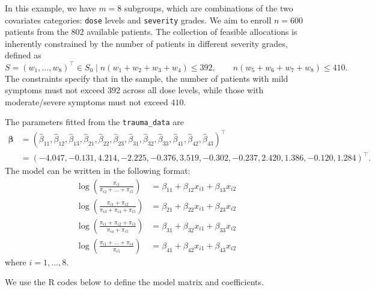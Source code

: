 In this example, we have $m=8$ subgroups, which are combinations of the two covariates categories: \texttt{dose} levels and \texttt{severity} grades. We aim to enroll $n=600$ patients from the $802$ available patients. The collection of feasible allocations is inherently constrained by the number of patients in different severity grades, defined as
$$S={(w_1, \ldots, w_8)^\top \in S_0 \mid n(w_1+w_2+w_3+w_4) \leq 392,
\qquad
n(w_5+w_6+w_7+w_8) \leq 410}.$$
The constraints specify that in the sample, the number of patients with mild symptoms must not exceed $392$ across all dose levels, while those with moderate/severe symptoms must not exceed $410$.

The parameters fitted from the \texttt{trauma\_data} are
\begin{align*}
\boldsymbol\beta &= (\hat\beta_{11}, \hat\beta_{12}, \hat\beta_{13}, \hat\beta_{21}, \hat\beta_{22}, \hat\beta_{23}, \hat\beta_{31}, \hat\beta_{32}, \hat\beta_{33}, \hat\beta_{41}, \hat\beta_{42}, \hat\beta_{43})^\top  \\
& = (-4.047, -0.131, 4.214, -2.225, -0.376, 3.519, -0.302, -0.237,  2.420, 1.386,  -0.120,  1.284)^\top.
\end{align*}
The model can be written in the following format:
\begin{align*}
    \log\left(\frac{\pi_{i1}}{\pi_{i2}+\dots+\pi_{i5}}\right)
        &= \beta_{11}+\beta_{12}x_{i1}+\beta_{13}x_{i2}\\
    \log\left(\frac{\pi_{i1}+\pi_{i2}}{\pi_{i3}+\pi_{i4}+\pi_{i5}}\right)
        &= \beta_{21}+\beta_{22}x_{i1}+\beta_{23}x_{i2}\\
    \log\left(\frac{\pi_{i1}+\pi_{i2}+\pi_{i3}}{\pi_{i4}+\pi_{i5}}\right)
        &= \beta_{31}+\beta_{32}x_{i1}+\beta_{33}x_{i2}\\
    \log\left(\frac{\pi_{i1}+\dots+\pi_{i4}}{\pi_{i5}}\right)
        &=\beta_{41}+\beta_{42}x_{i1}+\beta_{43}x_{i2}
\end{align*}
where $i=1,\dots,8$.

We use the R codes below to define the model matrix and coefficients.

